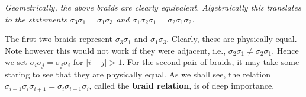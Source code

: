 \begin{center}
\begin{tikzpicture}
    \end{tikzpicture}
    \raisebox{2cm}{$=$}

    \emph{Geometrically, the above braids are clearly equivalent. Algebraically 
    this translates 
    to the statements $\sigma_3\sigma_1 = \sigma_1\sigma_3$ and $\sigma_1\sigma_2\sigma_1 = \sigma_2\sigma_1\sigma_2$.
    }
\end{center}
The first two braids represent $\sigma_3\sigma_1$ and $\sigma_1\sigma_3$. 
Clearly, these are physically equal. Note however this would not work if they were adjacent, i.e., 
$\sigma_2\sigma_1\ne\sigma_2\sigma_1$. Hence we set $\sigma_i\sigma_j=\sigma_j\sigma_i$ 
for $|i - j| > 1$. For the second pair of braids, it may take some staring to see that they are physically equal. 
As we shall see, the relation $\sigma_{i+1}\sigma_i\sigma_{i+1} = \sigma_{i}\sigma_{i+1}\sigma_i$,
called the \textbf{braid relation}, is of deep importance.



